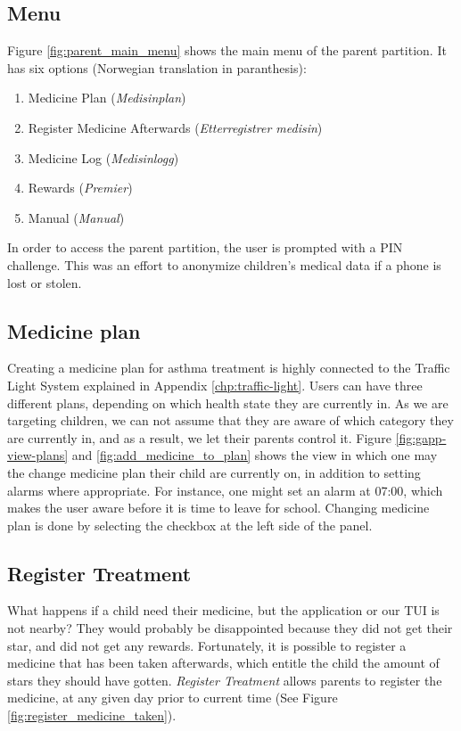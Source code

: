 \subsection{Menu}
\label{sec:description-menu}
Figure \ref{fig:parent_main_menu} shows the main menu of the parent partition. It has six options (Norwegian translation in paranthesis):
\begin{enumerate}
  \item Medicine Plan (\emph{Medisinplan})
  \item Register Medicine Afterwards (\emph{Etterregistrer medisin})
  \item Medicine Log (\emph{Medisinlogg})
  \item Rewards (\emph{Premier})
  \item Manual (\emph{Manual})
\end{enumerate} 

In order to access the parent partition, the user is prompted with a PIN challenge. This was an effort to anonymize children's medical data if a phone is lost or stolen. 

\subsection{Medicine plan}
\label{sec:description-medicine-plan}
Creating a medicine plan for asthma treatment is highly connected to the Traffic Light System explained in Appendix \ref{chp:traffic-light}.
Users can have three different plans, depending on which health state they are currently in. As we are targeting children, we can not assume that they are aware of which category they are currently in, and as a result, we let their parents control it. Figure \ref{fig:gapp-view-plans} and \ref{fig:add_medicine_to_plan} shows the view in which one may the change medicine plan their child are currently on, in addition to setting alarms where appropriate. For instance, one might set an alarm at 07:00, which makes the user aware before it is time to leave for school. Changing medicine plan is done by selecting the checkbox at the left side of the panel.  


\subsection{Register Treatment}
\label{sec:description-register-medicine}
What happens if a child need their medicine, but the application or our TUI is not nearby? They would probably be disappointed because they did not get their star, and did not get any rewards. Fortunately, it is possible to register a medicine that has been taken afterwards, which entitle the child the amount of stars they should have gotten. \emph{Register Treatment} allows parents to register the medicine, at any given day prior to current time (See Figure \ref{fig:register_medicine_taken}).  



